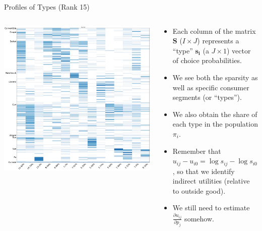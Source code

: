 \documentclass[aspectratio=169,10pt]{beamer}
\begin{document}
\begin{frame}{Profiles of Types (Rank 15)}
\begin{columns}
\begin{column}{0.5\textwidth}
    \includegraphics[height=0.95\textheight]{resources/hpc_rank_15_profiles}
\end{column}
\begin{column}{0.5\textwidth}
    \begin{itemize}
        \item Each column of the matrix $\symbf{S}$ ($I \times J$) represents a ``type'' $\symbf{s_i}$ (a $J \times 1$) vector of choice probabilities.
        \item We see both the \alert{sparsity} as well as specific consumer \alert{segments} (or ``types'').
        \item We also obtain the share of each type in the population $\pi_i$.
        \item Remember that $u_{ij} - u_{i0} = \log s_{ij} - \log s_{i0}$, so that we identify indirect utilities (relative to outside good).
        \item We still need to estimate $\frac{\partial u_{ij}}{\partial p_j}$ somehow.
    \end{itemize}
\end{column}
\end{columns}
\end{frame}
\end{document}
